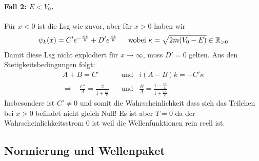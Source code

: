 \paragraph{Fall 2: $E<V_0$.} Für $x<0$ ist die Lsg wie zuvor, aber für
$x>0$ haben wir
\begin{align*}
    \psi_k (x) = C' e^{- \frac{\kappa x}{\hbar}} + D' e^{\frac{\kappa x}{\hbar}}
    \hspace{15pt} \text{wobei } \kappa = \sqrt{2m(V_0-E)} \in \mathbb{R}_{>0}
\end{align*}
Damit diese Lsg nicht explodiert für $x \rightarrow \infty$, muss $D' = 0$
gelten. Aus den Stetigkeitsbedingungen folgt:
\begin{align*}
    A + B = C'
    \hspace{10pt} &\text{und} \hspace{10pt}
    i (A-B) k = - C' \kappa
    \\
    \Rightarrow \hspace{10pt}
    \frac{C'}{A} = \frac{2}{1+\frac{i \kappa}{k}}
    \hspace{10pt} &\text{und} \hspace{10pt}
    \frac{B}{A} = \frac{1-\frac{i \kappa}{k}}{1+\frac{i \kappa}{k}}
\end{align*}
Insbesondere ist $C' \neq 0$ und somit die Wahrscheinlichkeit dass sich das
Teilchen bei $x>0$ befindet nicht gleich Null! Es ist aber $T=0$ da
der Wahrscheinlichkeitsstrom $0$ ist weil die Wellenfunktionen rein reell ist.

\subsection{Normierung und Wellenpaket}

